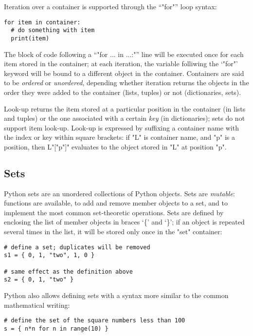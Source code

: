 {Iteration over a container is supported through the ``"for"'' loop
syntax:
\begin{lstlisting}
for item in container:
  # do something with item
  print(item)
\end{lstlisting}
The block of code following a ``"for ... in ...:"'' line will be
executed once for each item stored in the container; at each
iteration, the variable folliwing the `"for"' keyword will be bound to
a different object in the container.  Containers are said to be
\emph{ordered} or \emph{unordered}, depending whether iteration
returns the objects in the order they were added to the container
(lists, tuples) or not (dictionaries, sets).

Look-up returns the item stored at a particular position in the
container (in lists and tuples) or the one associated with a certain
\emph{key} (in dictionaries); sets do not support item look-up.  
Look-up is expressed by suffixing a container name with the index or key
within square brackets: if "L" is container name, and "p" is a
position, then L"["p"]" evaluates to the object stored in "L" at
position "p".

\subsection{Sets}
\label{sec:sets}

Python sets are an unordered collections of Python objects.  Sets are
\emph{mutable}: functions are available, to add and remove member objects to
a set, and to implement the most common set-theoretic operations.
Sets are defined by enclosing the list of member objects in braces
`\{' and `\}'; if an object is repeated several times in the list,
it will be stored only once in the "set" container:
\begin{lstlisting}
# define a set; duplicates will be removed
s1 = { 0, 1, "two", 1, 0 }

# same effect as the definition above
s2 = { 0, 1, "two" }
\end{lstlisting}
Python also allows defining sets with a syntax more similar to the
common mathematical writing:
\begin{lstlisting}
# define the set of the square numbers less than 100
s = { n*n for n in range(10) }


\end{lstlisting}}
